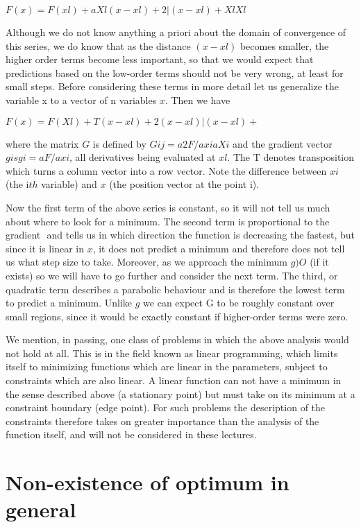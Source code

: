  
              $F(x) = F(xl) + aXl  (x-xl) + 2 |  (x-xl)  +
                       Xl             Xl$
 
 
Although we do not know anything a priori about the domain of convergence
of this series, we do know that as the distance $(x -xl)$ becomes smaller,
the higher order terms become less important, so that we would expect
that predictions based on the low-order terms should not be very wrong,
at least for small steps.  Before considering these terms in more detail
let us generalize the variable x to a vector of n variables $x$.  Then we
have
 
          $F(x) = F(Xl) + T(x-xl) + 2 (x -xl)  |(x - xl) +$
 
 
          where the matrix $G$ is defined by $Gij = a2F/axiaXi$ and
          the gradient vector $g is gi = aF/axi$, all derivatives
          being evaluated at $xl$.  The T denotes transposition
          which turns a column vector into a row vector.  Note
          the difference between $xi$ (the i$th$ variable) and $x$
          (the position vector at the point i).
 
Now the first term of the above series is constant, so it will not tell
us much about where to look for a minimum.  The second term is
proportional to the gradient  $ $
and tells us in which direction the function is
decreasing the fastest, but since it is linear in $x$, it does not predict
a minimum and therefore does not tell us what step size to take.
Moreover, as we approach the minimum $g ) O$ (if it exists)
so we will have to
go further and consider the next term.  The third, or quadratic term
describes a parabolic behaviour and is therefore the lowest term to
predict a minimum.  Unlike $g$ we can expect G to be roughly constant over
small regions, since it would be exactly constant if higher-order terms
were zero.
 
     We mention, in passing, one class of problems in which the above
analysis would not hold at all.  This is in the field known as linear
programming, which limits itself to minimizing functions which are linear
in the parameters, subject to constraints which are also linear.  A
linear function can not have a minimum in the sense described above (a
stationary point) but must take on its minimum at a constraint boundary
(edge point).  For such problems the description of the constraints therefore
takes on greater importance than the analysis of the function
itself, and will not be considered in these lectures.
 
 
\section{Non-existence of optimum in general}
 
